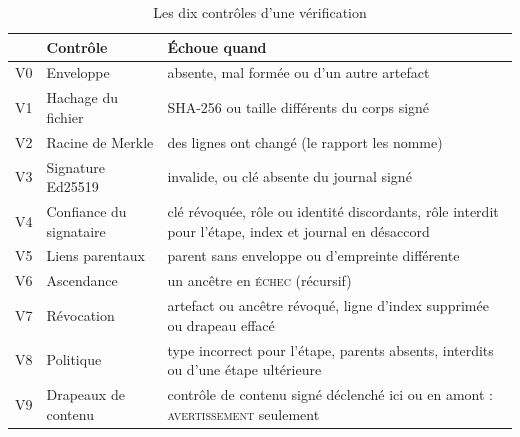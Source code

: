 \documentclass[conference]{IEEEtran}
\newcommand{\st}[1]{\textsc{#1}}
\begin{document}
\begin{table}[t]
\caption{Les dix contrôles d'une vérification}
\label{tab:checks}
\centering
\scriptsize
\setlength{\tabcolsep}{3pt}
\begin{tabular}{@{}l>{\raggedright}p{2.4cm}>{\raggedright\arraybackslash}p{5.4cm}@{}}
\toprule
 & Contrôle & Échoue quand \\
\midrule
V0 & Enveloppe & absente, mal formée ou d'un autre artefact \\
V1 & Hachage du fichier & SHA-256 ou taille différents du corps signé \\
V2 & Racine de Merkle & des lignes ont changé (le rapport les nomme) \\
V3 & Signature Ed25519 & invalide, ou clé absente du journal signé \\
V4 & Confiance du signataire & clé révoquée, rôle ou identité discordants, rôle interdit pour l'étape, index et journal en désaccord \\
V5 & Liens parentaux & parent sans enveloppe ou d'empreinte différente \\
V6 & Ascendance & un ancêtre en \st{échec} (récursif) \\
V7 & Révocation & artefact ou ancêtre révoqué, ligne d'index supprimée ou drapeau effacé \\
V8 & Politique & type incorrect pour l'étape, parents absents, interdits ou d'une étape ultérieure \\
V9 & Drapeaux de contenu & contrôle de contenu signé déclenché ici ou en amont : \st{avertissement} seulement \\
\bottomrule
\end{tabular}
\end{table}
\end{document}
